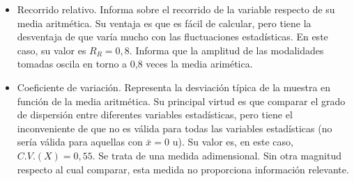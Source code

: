\begin{itemize}
	\item Recorrido relativo. Informa sobre el recorrido de la variable respecto de su media aritmética. Su ventaja es que es fácil de calcular, pero tiene la desventaja de que varía mucho con las fluctuaciones estadísticas. En este caso, su valor es $R_{R} = 0,8$. Informa que la amplitud de las modalidades tomadas oscila en torno a 0,8 veces la media arimética.
	
	
	\item Coeficiente de variación. Representa la desviación típica de la muestra en función de la media aritmética. Su principal virtud es que comparar el grado de dispersión entre diferentes variables estadísticas, pero tiene el inconveniente de que no es válida para todas las variables estadísticas (no sería válida para aquellas con $\bar x = 0$ u). Su valor es, en este caso, $C.V.(X) = 0,55$. Se trata de una medida adimensional. Sin otra magnitud respecto al cual comparar, esta medida no proporciona información relevante.
	
\end{itemize}




